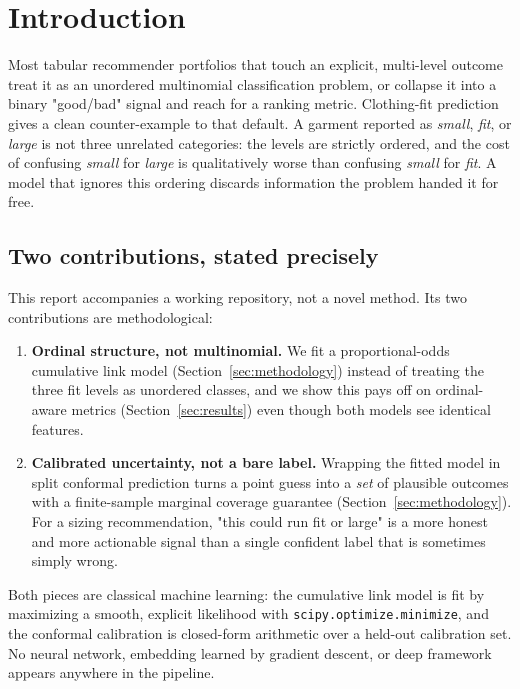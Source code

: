 \section{Introduction}
\label{sec:introduction}

Most tabular recommender portfolios that touch an explicit, multi-level
outcome treat it as an unordered multinomial classification problem, or
collapse it into a binary "good/bad" signal and reach for a ranking metric.
Clothing-fit prediction gives a clean counter-example to that default. A
garment reported as \emph{small}, \emph{fit}, or \emph{large} is not three
unrelated categories: the levels are strictly ordered, and the cost of
confusing \emph{small} for \emph{large} is qualitatively worse than
confusing \emph{small} for \emph{fit}. A model that ignores this ordering
discards information the problem handed it for free.

\subsection{Two contributions, stated precisely}

This report accompanies a working repository, not a novel method. Its two
contributions are methodological:

\begin{enumerate}
  \item \textbf{Ordinal structure, not multinomial.} We fit a
        proportional-odds cumulative link model (Section~\ref{sec:methodology})
        instead of treating the three fit levels as unordered classes, and we
        show this pays off on ordinal-aware metrics
        (Section~\ref{sec:results}) even though both models see identical
        features.
  \item \textbf{Calibrated uncertainty, not a bare label.} Wrapping the
        fitted model in split conformal prediction turns a point guess into
        a \emph{set} of plausible outcomes with a finite-sample marginal
        coverage guarantee (Section~\ref{sec:methodology}). For a sizing
        recommendation, "this could run fit or large" is a more honest and
        more actionable signal than a single confident label that is
        sometimes simply wrong.
\end{enumerate}

Both pieces are classical machine learning: the cumulative link model is fit
by maximizing a smooth, explicit likelihood with
\texttt{scipy.optimize.minimize}, and the conformal calibration is closed-form
arithmetic over a held-out calibration set. No neural network, embedding
learned by gradient descent, or deep framework appears anywhere in the
pipeline.

